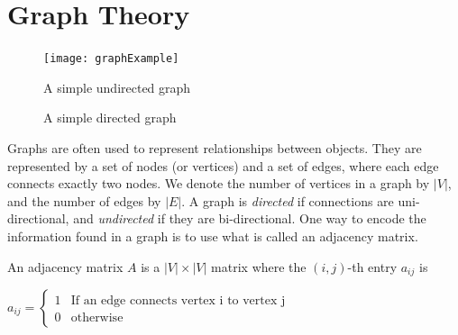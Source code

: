 
\label{lab:ImgSeg_eigenvalues}

\section*{Graph Theory}
\begin{figure}[h]
\texttt{[image: graphExample]}
\caption{A simple undirected graph}
\label{fig:example_graph}
\end{figure}

\begin{figure}[h]
\caption{A simple directed graph}
\end{figure}



Graphs are often used to represent relationships between objects.
They are represented by a set of nodes (or vertices) and a set of edges, where each edge connects exactly two nodes.
We denote the number of vertices in a graph by $|V|$, and the number of edges by $|E|$.
A graph is \emph{directed} if connections are uni-directional, and \emph{undirected} if they are bi-directional.
One way to encode the information found in a graph is to use what is called an adjacency matrix.
\begin{definition} An adjacency matrix $A$ is a $|V| \times |V|$ matrix where the $(i,j)$-th entry $a_{ij}$ is
\begin{center}
	$a_{ij} = \begin{cases} 1 & \mbox{If an edge connects vertex i to vertex j} \\ 0 & \mbox{otherwise} \end{cases}$
\end{center}
\end{definition}

